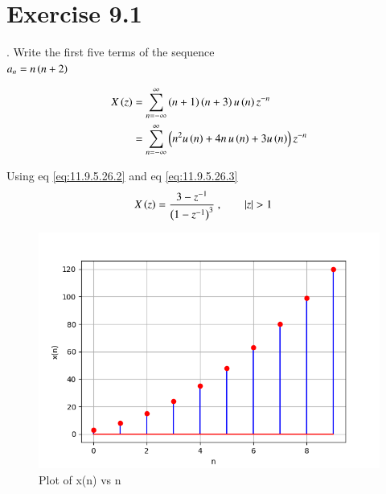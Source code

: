\documentclass[journal,12pt,twocolumn]{IEEEtran}
\begin{document}


\vspace{3cm}

\title{}
\author{EE23BTECH11024 - G.Karthik Yadav$^{*}$
}
\maketitle
\newpage
\bigskip



\section*{Exercise 9.1}

. \hspace{2pt}Write the first five terms of the sequence\\
$a_n = n \left(n+2\right)$

\solution




\begin{align}
    X \left(z\right) & = \sum_{n=-\infty}^{\infty}  \left(n+1\right)\left(n+3\right) u \left(n\right)   z^{-n} \\
    & = \sum_{n=-\infty}^{\infty}  \left(n^{2}u\left(n\right) + 4 n\, u\left(n\right)  + 3u\left(n\right) \right) z^{-n}
\end{align}    

Using  eq \eqref{eq:11.9.5.26.2} and eq \eqref{eq:11.9.5.26.3}
\begin{align}
     X \left(z\right) & = \frac{ 3-z^{-1}}{\left(1-z^{-1}\right)^3} \text{ ,}\qquad \left\vert z\right\vert>1
\end{align}

\begin{figure}[ht]
   \centering
   \includegraphics[width=1\columnwidth]{figs/plot1.png}
   \caption{Plot of x(n) vs n}
   \label{fig: 1.11.9.1.1}
\end{figure}
\end{document}
